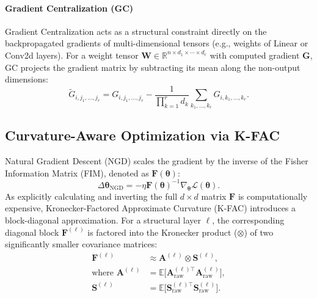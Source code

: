 \documentclass[conference]{IEEEtran}
\begin{document}
\paragraph{Gradient Centralization (GC)} Gradient Centralization acts as a structural constraint directly on the backpropagated gradients of multi-dimensional tensors (e.g., weights of Linear or Conv2d layers). For a weight tensor $\mathbf{W} \in \mathbb{R}^{n \times d_1 \times \cdots \times d_r}$ with computed gradient $\mathbf{G}$, GC projects the gradient matrix by subtracting its mean along the non-output dimensions:
\begin{equation}
\tilde{G}_{i, j_1, \dots, j_r} = G_{i, j_1, \dots, j_r} - \frac{1}{\prod_{k=1}^r d_k} \sum_{k_1,\dots,k_r} G_{i, k_1, \dots, k_r}.
\label{eq:gradient_centralization}
\end{equation}

\subsection{Curvature-Aware Optimization via K-FAC}
\label{subsec:kfac_bg}

Natural Gradient Descent (NGD) scales the gradient by the inverse of the Fisher Information Matrix (FIM), denoted as $\mathbf{F}(\boldsymbol{\theta})$:
\begin{equation}
\Delta \boldsymbol{\theta}_{\mathrm{NGD}} = -\eta \mathbf{F}(\boldsymbol{\theta})^{-1} \nabla_{\boldsymbol{\theta}} \mathcal{L}(\boldsymbol{\theta}).
\label{eq:ngd}
\end{equation}
As explicitly calculating and inverting the full $d \times d$ matrix $\mathbf{F}$ is computationally expensive, Kronecker-Factored Approximate Curvature (K-FAC) introduces a block-diagonal approximation. For a structural layer $\ell$, the corresponding diagonal block $\mathbf{F}^{(\ell)}$ is factored into the Kronecker product ($\otimes$) of two significantly smaller covariance matrices:
\begin{equation}
\begin{aligned}
\mathbf{F}^{(\ell)} &\approx \mathbf{A}^{(\ell)} \otimes \mathbf{S}^{(\ell)}, \\
\text{where } \mathbf{A}^{(\ell)} &= \mathbb{E}\bigl[\mathbf{A}^{(\ell)\top}_{\mathrm{raw}}\mathbf{A}^{(\ell)}_{\mathrm{raw}}\bigr], \\
\mathbf{S}^{(\ell)} &= \mathbb{E}\bigl[\mathbf{S}^{(\ell)\top}_{\mathrm{raw}}\mathbf{S}^{(\ell)}_{\mathrm{raw}}\bigr].
\end{aligned}
\label{eq:kfac_factors}
\end{equation}
\end{document}
